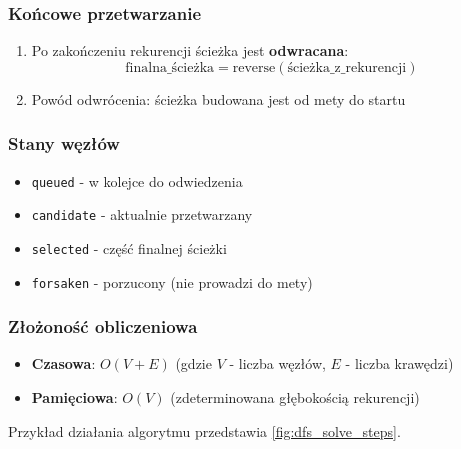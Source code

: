 \documentclass[../../../../doc.tex]{subfiles}
\begin{document}
\subsubsection{Końcowe przetwarzanie}
\begin{enumerate}
  \item Po zakończeniu rekurencji ścieżka jest \textbf{odwracana}:
        \[
          \text{finalna\_ścieżka} = \text{reverse}(\text{ścieżka\_z\_rekurencji})
        \]
  \item Powód odwrócenia: ścieżka budowana jest od mety do startu
\end{enumerate}

\subsubsection{Stany węzłów}
\begin{itemize}
  \item \texttt{queued} - w kolejce do odwiedzenia
  \item \texttt{candidate} - aktualnie przetwarzany
  \item \texttt{selected} - część finalnej ścieżki
  \item \texttt{forsaken} - porzucony (nie prowadzi do mety)
\end{itemize}

\subsubsection{Złożoność obliczeniowa}
\begin{itemize}
  \item \textbf{Czasowa}: $O(V + E)$ (gdzie $V$ - liczba węzłów, $E$ - liczba krawędzi)
  \item \textbf{Pamięciowa}: $O(V)$ (zdeterminowana głębokością rekurencji)
\end{itemize}

Przykład działania algorytmu przedstawia \cref{fig:dfs_solve_steps}.


\end{document}
